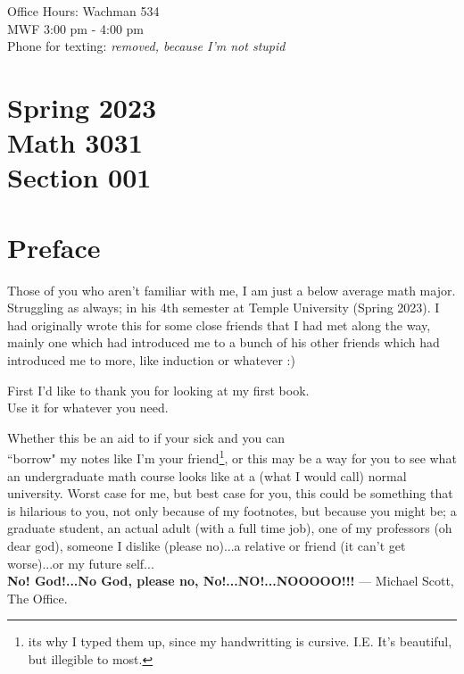 \documentclass[12pt]{book}
\begin{document}
\vspace{50pt}

\begin{center}
Office Hours: Wachman 534\\
MWF 3:00 pm - 4:00 pm\\
Phone for texting: \textit{removed, because I'm not stupid}\\%
\end{center}


%
\chapter*{\center \normalsize Spring 2023\\
Math 3031\\
Section 001\\}
%











\chapter*{Preface}
\hspace{\parindent} Those of you who aren't familiar with me, I am just a below average math major. Struggling as always; in his 4th semester at Temple University (Spring 2023). I had originally wrote this for some close friends that I had met along the way, mainly one which had introduced me to a bunch of his other friends which had introduced me to more, like induction or whatever :) 

\begin{center}First I'd like to thank you for looking at my first book. \\Use it for whatever you need.\end{center}

Whether this be an aid to if your sick and you can \\``borrow" my notes like I'm your friend\footnote{its why I typed them up, since my handwritting is cursive. I.E. It's beautiful, but illegible to most.}, or this may be a way for you to see what an undergraduate math course looks like at a (what I would call) normal university. 
Worst case for me, but best case for you, this could be something that is hilarious to you, not only because of my footnotes, but because you might be; a graduate student, an actual adult (with a full time job), one of my professors (oh dear god), someone I dislike (please no)...a relative or friend (it can't get worse)...\scriptsize or my future self... \normalsize \\
\textbf{No! God!...No God, please no, No!...NO!...NOOOOO!!!} --- Michael Scott, The Office.
\end{document}
